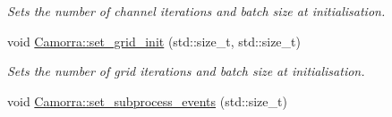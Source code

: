 \begin{DoxyCompactItemize}
\begin{DoxyCompactList}\small\item\em Sets the number of channel iterations and batch size at initialisation. \end{DoxyCompactList}\item 
\hypertarget{a00798_ac158f04335b253127295e4a594f70a5c}{
void \hyperlink{a00798_ac158f04335b253127295e4a594f70a5c}{Camorra::set\_\-grid\_\-init} (std::size\_\-t, std::size\_\-t)}
\label{a00798_ac158f04335b253127295e4a594f70a5c}

\begin{DoxyCompactList}\small\item\em Sets the number of grid iterations and batch size at initialisation. \end{DoxyCompactList}\item 
\hypertarget{a00798_acf2bf549282ae12be161d55d81660323}{
void \hyperlink{a00798_acf2bf549282ae12be161d55d81660323}{Camorra::set\_\-subprocess\_\-events} (std::size\_\-t)}
\label{a00798_acf2bf549282ae12be161d55d81660323}


\end{DoxyCompactItemize}
